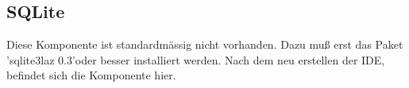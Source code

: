 %
%
%
%
%
\subsection{SQLite}
Diese Komponente ist standardmässig nicht vorhanden. Dazu muß erst das Paket 'sqlite3laz 0.3'oder besser installiert werden.  
\label{fig:LazDataAccess02}Nach dem neu erstellen der IDE, befindet sich die Komponente hier.


